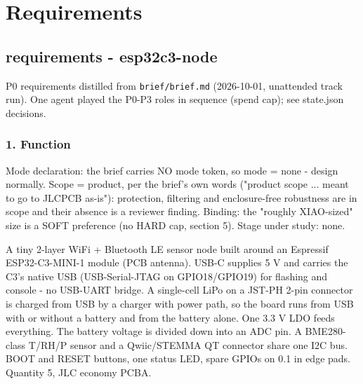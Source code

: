 \documentclass[11pt]{article}
\begin{document}
\section{Requirements}
\subsection*{requirements - esp32c3-node}
P0 requirements distilled from \texttt{brief/brief.md} (2026-10-01, unattended track run). One agent played the P0-P3 roles in sequence (spend cap); see state.json decisions.

\subsubsection*{1. Function}
Mode declaration: the brief carries NO mode token, so mode = none - design normally. Scope = product, per the brief's own words ("product scope ... meant to go to JLCPCB as-is"): protection, filtering and enclosure-free robustness are in scope and their absence is a reviewer finding. Binding: the "roughly XIAO-sized" size is a SOFT preference (no HARD cap, section 5). Stage under study: none.

A tiny 2-layer WiFi + Bluetooth LE sensor node built around an Espressif ESP32-C3-MINI-1 module (PCB antenna). USB-C supplies 5 V and carries the C3's native USB (USB-Serial-JTAG on GPIO18/GPIO19) for flashing and console - no USB-UART bridge. A single-cell LiPo on a JST-PH 2-pin connector is charged from USB by a charger with power path, so the board runs from USB with or without a battery and from the battery alone. One 3.3 V LDO feeds everything. The battery voltage is divided down into an ADC pin. A BME280-class T/RH/P sensor and a Qwiic/STEMMA QT connector share one I2C bus. BOOT and RESET buttons, one status LED, spare GPIOs on 0.1 in edge pads. Quantity 5, JLC economy PCBA.
\end{document}
